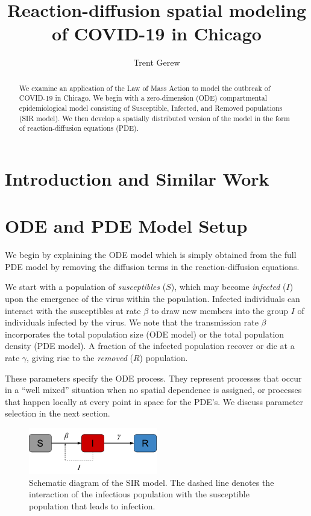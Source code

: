 \documentclass[11pt]{article}
\title{Reaction-diffusion spatial modeling of COVID-19 in Chicago}
\author{Trent Gerew}
\begin{document}
\maketitle

\begin{abstract}
	We examine an application of the Law of Mass Action to model the outbreak of COVID-19 in Chicago.
	We begin with a zero-dimension (ODE) compartmental epidemiological model consisting of Susceptible, Infected, and Removed populations (SIR model).
	We then develop a spatially distributed version of the model in the form of reaction-diffusion equations (PDE).
\end{abstract}

\section{Introduction and Similar Work}

\section{ODE and PDE Model Setup}
We begin by explaining the ODE model which is simply obtained from the full PDE model by removing the diffusion terms in the reaction-diffusion equations.

We start with a population of \textit{susceptibles} ($S$), which may become \textit{infected} ($I$) upon the emergence of the virus within the population.
Infected individuals can interact with the susceptibles at rate $\beta$ to draw new members into the group $I$ of individuals infected by the virus.
We note that the transmission rate $\beta$ incorporates the total population size (ODE model) or the total population density (PDE model).
A fraction of the infected population recover or die at a rate $\gamma$, giving rise to the \textit{removed} ($R$) population.

These parameters specify the ODE process.
They represent processes that occur in a ``well mixed'' situation when no spatial dependence is assigned,
or processes that happen locally at every point in space for the PDE's.
We discuss parameter selection in the next section.

\begin{figure}[h]
	\centering
	\includegraphics[width=0.5\textwidth]{sir_schematic}
	\caption{Schematic diagram of the SIR model. The dashed line denotes the interaction of the infectious population with the susceptible population that leads to infection.}
	\label{fig:schematic}
\end{figure}
\end{document}
